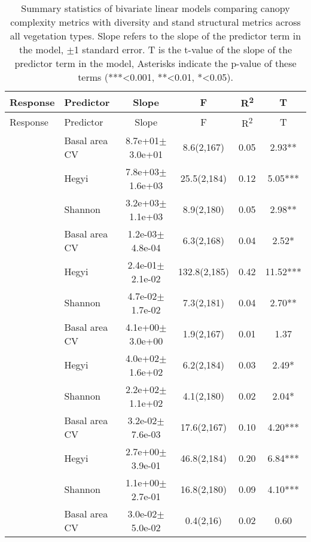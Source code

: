 \begin{longtable}{llcccS[table-format=-2.2, table-space-text-post = {***}]}
\caption[Bivariate linear model summary]{Summary statistics of bivariate linear models comparing canopy complexity metrics with diversity and stand structural metrics across all vegetation types. Slope refers to the slope of the predictor term in the model, $\pm$1 standard error. T is the t-value of the slope of the predictor term in the model, Asterisks indicate the p-value of these terms (***<0.001, **<0.01, *<0.05).} 
\label{tls:bivar_lm_summ_all} \\
\toprule
{Response} & {Predictor} & {Slope} & {F} & {R\textsuperscript{2}} & {T} \\ 
\midrule
\endfirsthead
\toprule
{Response} & {Predictor} & {Slope} & {F} & {R\textsuperscript{2}} & {T} \\ 
\midrule
\endhead
{} & Basal area CV &  8.7e+01$\pm$3.0e+01 & 8.6(2,167) & 0.05 & 2.93** \\* 
   & Hegyi &  7.8e+03$\pm$1.6e+03 & 25.5(2,184) & 0.12 & 5.05*** \\* 
   & Shannon &  3.2e+03$\pm$1.1e+03 & 8.9(2,180) & 0.05 & 2.98** \\ 
   \midrule
{} & Basal area CV &  1.2e-03$\pm$4.8e-04 & 6.3(2,168) & 0.04 & 2.52* \\* 
   & Hegyi &  2.4e-01$\pm$2.1e-02 & 132.8(2,185) & 0.42 & 11.52*** \\* 
   & Shannon &  4.7e-02$\pm$1.7e-02 & 7.3(2,181) & 0.04 & 2.70** \\ 
   \midrule
{} & Basal area CV &  4.1e+00$\pm$3.0e+00 & 1.9(2,167) & 0.01 & 1.37 \\* 
   & Hegyi &  4.0e+02$\pm$1.6e+02 & 6.2(2,184) & 0.03 & 2.49* \\* 
   & Shannon &  2.2e+02$\pm$1.1e+02 & 4.1(2,180) & 0.02 & 2.04* \\ 
   \midrule
{} & Basal area CV &  3.2e-02$\pm$7.6e-03 & 17.6(2,167) & 0.10 & 4.20*** \\* 
   & Hegyi &  2.7e+00$\pm$3.9e-01 & 46.8(2,184) & 0.20 & 6.84*** \\* 
   & Shannon &  1.1e+00$\pm$2.7e-01 & 16.8(2,180) & 0.09 & 4.10*** \\ 
   \midrule
{} & Basal area CV &  3.0e-02$\pm$5.0e-02 & 0.4(2,16) & 0.02 & 0.60 \\* 

\end{longtable}
